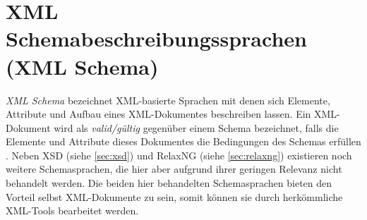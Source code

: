 \section{XML Schemabeschreibungssprachen (XML Schema)}
\label{sec:xmlschema}

\emph{XML Schema} bezeichnet XML-basierte Sprachen mit denen sich Elemente, Attribute und Aufbau eines XML-Dokumentes beschreiben lassen. 
Ein XML-Dokument wird als \emph{valid/gültig} gegenüber einem Schema bezeichnet, falls die Elemente und Attribute dieses Dokumentes die Bedingungen des Schemas erfüllen \cite{taxonomyXMLSchema}.
Neben XSD (siehe \cref{sec:xsd}) und RelaxNG (siehe \cref{sec:relaxng}) existieren noch weitere Schemasprachen, die hier aber aufgrund ihrer geringen Relevanz nicht behandelt werden. Die beiden hier behandelten Schemasprachen bieten den Vorteil selbst XML-Dokumente zu sein, somit können sie durch herkömmliche XML-Tools bearbeitet werden.




